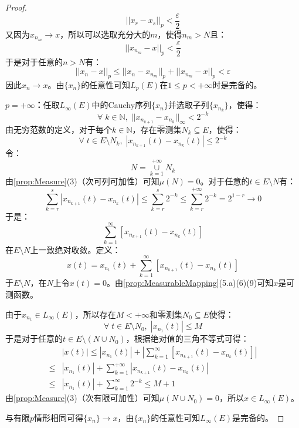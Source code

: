 \begin{proof}
\begin{equation*}
		||x_r-x_s||_p<\frac{\varepsilon}{2}
	\end{equation*}
	又因为$x_{n_m}\to x$，所以可以选取充分大的$m$，使得$n_m>N$且：
	\begin{equation*}
		||x_{n_m}-x||_p<\frac{\varepsilon}{2}
	\end{equation*}
	于是对于任意的$n>N$有：
	\begin{equation*}
		||x_n-x||_p\leqslant||x_n-x_{n_m}||_p+||x_{n_m}-x||_p<\varepsilon
	\end{equation*}
	因此$x_n\to x$。由$\{x_n\}$的任意性可知$L_p(E)$在$1\leqslant p<+\infty$时是完备的。\par
	\textbf{$p=+\infty$：}任取$L_\infty(E)$中的Cauchy序列$\{x_n\}$并选取子列$\{x_{n_k}\}$，使得：
	\begin{equation*}
		\forall\;k\in\mathbb{N},\;||x_{n_{k+1}}-x_{n_k}||_\infty<2^{-k}
	\end{equation*}
	由无穷范数的定义，对于每个$k\in\mathbb{N}$，存在零测集$N_k\subseteq E$，使得：
	\begin{equation*}
		\forall\;t\in E\setminus N_k,\;|x_{n_{k+1}}(t)-x_{n_k}(t)|\leqslant2^{-k}
	\end{equation*}
	令：
	\begin{equation*}
		N=\underset{k=1}{\overset{+\infty}{\cup}}N_k
	\end{equation*}
	由\cref{prop:Measure}(3)（次可列可加性）可知$\mu(N)=0$。对于任意的$t\in E\setminus N$有：
	\begin{equation*}
		\sum_{k=r}^{s}|x_{n_{k+1}}(t)-x_{n_k}(t)|\leqslant\sum_{k=r}^{s}2^{-k}\leqslant\sum_{k=r}^{+\infty}2^{-k}=2^{1-r}\to0
	\end{equation*}
	于是：
	\begin{equation*}
		\sum_{k=1}^{\infty}\left[x_{n_{k+1}}(t)-x_{n_k}(t)\right]
	\end{equation*}
	在$E\setminus N$上一致绝对收敛。定义：
	\begin{equation*}
		x(t)=x_{n_1}(t)+\sum_{k=1}^{\infty}[x_{n_{k+1}}(t)-x_{n_k}(t)]
	\end{equation*}
	于$E\setminus N$，在$N$上令$x(t)=0$。由\cref{prop:MeasurableMapping}(5.a)(6)(9)可知$x$是可测函数。\par
	由于$x_{n_1}\in L_\infty(E)$，所以存在$M<+\infty$和零测集$N_0\subseteq E$使得：
	\begin{equation*}
		\forall\;t\in E\setminus N_0,\;|x_{n_1}(t)|\leqslant M
	\end{equation*}
	于是对于任意的$t\in E\setminus(N\cup N_0)$，根据绝对值的三角不等式可得：
	\begin{align*}
		&|x(t)|\leqslant|x_{n_1}(t)|+\left|\sum_{k=1}^{\infty}[x_{n_{k+1}}(t)-x_{n_k}(t)]\right| \\
		\leqslant&|x_{n_1}(t)|+\sum_{k=1}^{+\infty}|x_{n_{k+1}}(t)-x_{n_k}(t)| \\
		\leqslant&|x_{n_1}(t)|+\sum_{k=1}^{\infty}2^{-k}\leqslant M+1
	\end{align*}
	由\cref{prop:Measure}(3)（次有限可加性）可知$\mu(N\cup N_0)=0$，所以$x\in L_\infty(E)$。\par
	与有限$p$情形相同可得$\{x_n\}\to x$，由$\{x_n\}$的任意性可知$L_\infty(E)$是完备的。
\end{proof}
